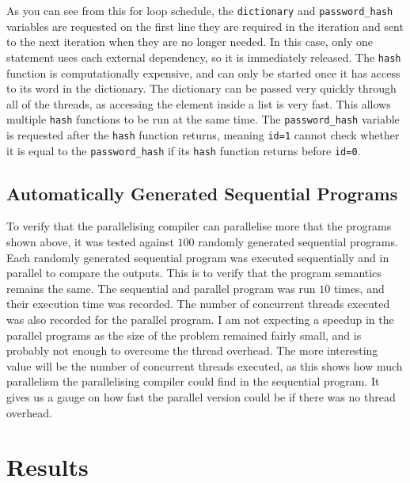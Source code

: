 As you can see from this for loop schedule, the \texttt{dictionary} and \texttt{password\_hash} variables are requested on the first line they are required in the iteration and sent to the next iteration when they are no longer needed. In this case, only one statement uses each external dependency, so it is immediately released. The \texttt{hash} function is computationally expensive, and can only be started once it has access to its word in the dictionary. The dictionary can be passed very quickly through all of the threads, as accessing the element inside a list is very fast. This allows multiple \texttt{hash} functions to be run at the same time. The \texttt{password\_hash} variable is requested after the \texttt{hash} function returns, meaning \texttt{id=1} cannot check whether it is equal to the \texttt{password\_hash} if its \texttt{hash} function returns before \texttt{id=0}.

\subsection{Automatically Generated Sequential Programs}
To verify that the parallelising compiler can parallelise more that the programs shown above, it was tested against $100$ randomly generated sequential programs. Each randomly generated sequential program was executed sequentially and in parallel to compare the outputs. This is to verify that the program semantics remains the same. The sequential and parallel program was run $10$ times, and their execution time was recorded. The number of concurrent threads executed was also recorded for the parallel program. I am not expecting a speedup in the parallel programs as the size of the problem remained fairly small, and is probably not enough to overcome the thread overhead. The more interesting value will be the number of concurrent threads executed, as this shows how much parallelism the parallelising compiler could find in the sequential program. It gives us a gauge on how fast the parallel version could be if there was no thread overhead.


\section{Results}
